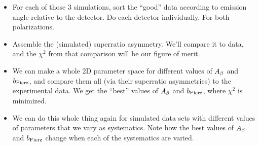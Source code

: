 \begin{itemize}
\begin{itemize}
	\end{itemize}
	\item For each of those 3 simulations, sort the ``good'' data according to emission angle relative to the detector.  Do each detector individually.  For both polarizations.
	\item Assemble the (simulated) superratio asymmetry.  We'll compare it to data, and the $\chi^2$ from that comparison will be our figure of merit.  
	\item We can make a whole 2D parameter space for different values of $A_{\beta}$ and $b_{\mathrm{Fierz}}$, and compare them all (via their superratio asymmetries) to the experimental data.  We get the ``best'' values of $A_{\beta}$ and $b_{\mathrm{Fierz}}$, where $\chi^2$ is minimized.
	\item We can do this whole thing again for simulated data sets with different values of parameters that we vary as systematics.  Note how the best values of $A_{\beta}$ and $b_{\mathrm{Fierz}}$ change when each of the systematics are varied.
\end{itemize}

